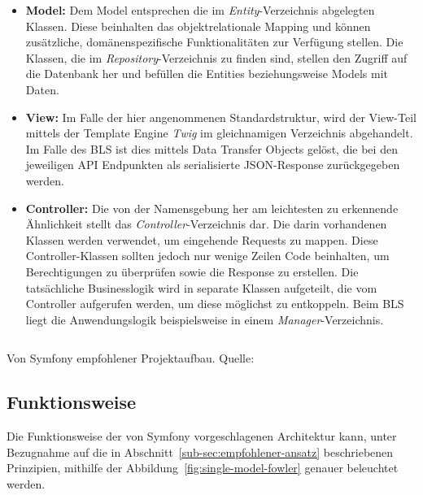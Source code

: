 \documentclass[a4paper,12pt,twoside]{scrreprt}
\begin{document}
\begin{itemize}
    \item \textbf{Model:} Dem Model entsprechen die im \textit{Entity}-Verzeichnis abgelegten Klassen. Diese beinhalten das objektrelationale Mapping und können zusätzliche, domänenspezifische Funktionalitäten zur Verfügung stellen. Die Klassen, die im \textit{Repository}-Verzeichnis zu finden sind, stellen den Zugriff auf die Datenbank her und befüllen die Entities beziehungsweise Models mit Daten. \parencite[][]{tutorials_point_i_pvt_ltd_symfony_nodate}
    \item \textbf{View:} Im Falle der hier angenommenen Standardstruktur, wird der View-Teil mittels der Template Engine \textit{Twig} im gleichnamigen Verzeichnis abgehandelt. Im Falle des BLS ist dies mittels Data Transfer Objects gelöst, die bei den jeweiligen API Endpunkten als serialisierte JSON-Response zurückgegeben werden. \parencite[][]{tutorials_point_i_pvt_ltd_symfony_nodate}
    \item \textbf{Controller:} Die von der Namensgebung her am leichtesten zu erkennende Ähnlichkeit stellt das \textit{Controller}-Verzeichnis dar. Die darin vorhandenen Klassen werden verwendet, um eingehende Requests zu mappen. Diese Controller-Klassen sollten jedoch nur wenige Zeilen Code beinhalten, um Berechtigungen zu überprüfen sowie die Response zu erstellen. Die tatsächliche Businesslogik wird in separate Klassen aufgeteilt, die vom Controller aufgerufen werden, um diese möglichst zu entkoppeln. \parencite[][]{symfony_symfony_2020} Beim BLS liegt die Anwendungslogik beispielsweise in einem \textit{Manager}-Verzeichnis.
\end{itemize}

\begin{listing}[ht]
    \inputminted[fontsize=\footnotesize,linenos]{text}{code/symfony_directory_structure.txt}
    \caption[Von Symfony empfohlener Projektaufbau]{Von Symfony empfohlener Projektaufbau. Quelle: \cite[]{symfony_symfony_2020}}
    \label{code:symfony-project-structure}
\end{listing}

\subsection{Funktionsweise}
\label{sub-sec:standard-funktionsweise}
Die Funktionsweise der von Symfony vorgeschlagenen Architektur kann, unter Bezugnahme auf die in Abschnitt~\ref{sub-sec:empfohlener-ansatz} beschriebenen Prinzipien, mithilfe der Abbildung~\ref{fig:single-model-fowler} genauer beleuchtet werden.
\end{document}
